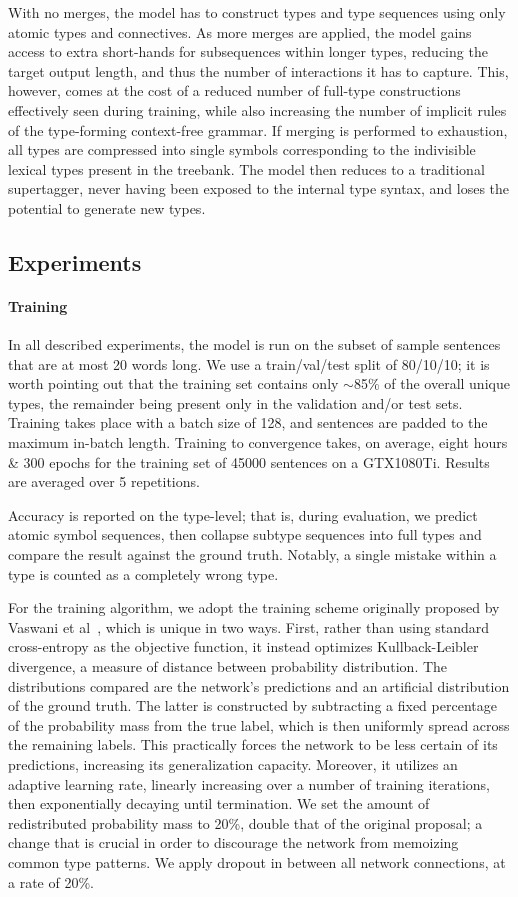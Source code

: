 With no merges, the model has to construct types and type sequences using only atomic types and connectives.
As more merges are applied, the model gains access to extra short-hands for subsequences within longer types, reducing the target output length, and thus the number of interactions it has to capture.
This, however, comes at the cost of a reduced number of full-type constructions effectively seen during training, while also increasing the number of implicit rules of the type-forming context-free grammar.
If merging is performed to exhaustion, all types are compressed into single symbols corresponding to the indivisible lexical types present in the treebank. 
The model then reduces to a traditional supertagger, never having been exposed to the internal type syntax, and loses the potential to generate new types.

\subsection{Experiments}
\paragraph{Training}
In all described experiments, the model is run on the subset of sample sentences that are at most 20 words long. 
We use a train/val/test split of 80/10/10; it is worth pointing out that the training set contains only $\sim$85\% of the overall unique types, the remainder being present only in the validation and/or test sets.
Training takes place with a batch size of 128, and sentences are padded to the maximum in-batch length. 
Training to convergence takes, on average, eight hours \& 300 epochs for the training set of 45000 sentences on a GTX1080Ti. 
Results are averaged over 5 repetitions.

Accuracy is reported on the type-level; that is, during evaluation, we predict atomic symbol sequences, then collapse subtype sequences into full types and compare the result against the ground truth. 
Notably, a single mistake within a type is counted as a completely wrong type. 

For the training algorithm, we adopt the training scheme originally proposed by Vaswani et al~\cite{vaswani2017attention}, which is unique in two ways.
First, rather than using standard cross-entropy as the objective function, it instead optimizes Kullback-Leibler divergence, a measure of distance between probability distribution.
The distributions compared are the network's predictions and an artificial distribution of the ground truth.
The latter is constructed by subtracting a fixed percentage of the probability mass from the true label, which is then uniformly spread across the remaining labels.
This practically forces the network to be less certain of its predictions, increasing its generalization capacity.
Moreover, it utilizes an adaptive learning rate, linearly increasing over a number of training iterations, then exponentially decaying until termination.
We set the amount of redistributed probability mass to 20\%, double that of the original proposal; a change that is crucial in order to discourage the network from memoizing common type patterns.
We apply dropout in between all network connections, at a rate of 20\%.


